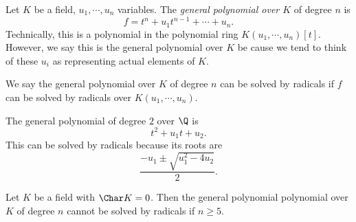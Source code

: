 \documentclass[a4paper]{article}
\begin{document}
\begin{defi}
  Let $K$ be a field, $u_1, \cdots, u_n$ variables. The \emph{general polynomial over $K$} of degree $n$ is
  \[
    f = t^n + u_1t^{n - 1} + \cdots + u_n.
  \]
  Technically, this is a polynomial in the polynomial ring $K(u_1, \cdots, u_n)[t]$. However, we say this is the general polynomial over $K$ be cause we tend to think of these $u_i$ as representing actual elements of $K$.
\end{defi}

We say the general polynomial over $K$ of degree $n$ can be solved by radicals if $f$ can be solved by radicals over $K(u_1, \cdots, u_n)$.

\begin{eg}
  The general polynomial of degree $2$ over $\Q$ is
  \[
    t^2 + u_1 t + u_2.
  \]
  This can be solved by radicals because its roots are
  \[
    \frac{-u_1 \pm \sqrt{u_1^2 - 4u_2}}{2}.
  \]
\end{eg}

\begin{thm}
  Let $K$ be a field with $\Char K = 0$. Then the general polynomial polynomial over $K$ of degree $n$ cannot be solved by radicals if $n \geq 5$.
\end{thm}
\end{document}
